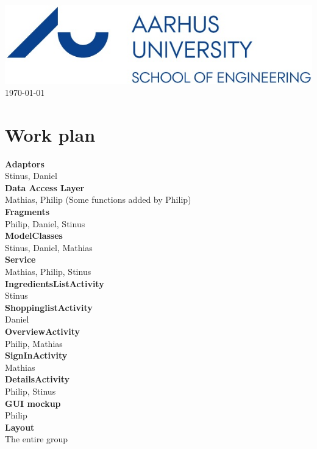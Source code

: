 \documentclass[12pt]{article}
\begin{document}
\begin{titlepage}
		
		\includegraphics[scale=0.5]{Img/logo.jpg}\\[1cm]
		
		
		{\large \today}\\[0.5cm] %
		
		
		\vfill %
		
	\end{titlepage}
	
\newpage
\tableofcontents
\newpage
\listoffigures
\newpage

\hypersetup{linkcolor=blue}

\section{Work plan}

\textbf{Adaptors}
\\
Stinus, Daniel\\
\textbf{Data Access Layer}\\
Mathias, Philip (Some functions added by Philip)\\
\textbf{Fragments}\\
Philip, Daniel, Stinus\\
\textbf{ModelClasses}\\
Stinus, Daniel, Mathias\\
\textbf{Service}\\
Mathias, Philip, Stinus\\
\textbf{IngredientsListActivity}\\
Stinus\\
\textbf{ShoppinglistActivity}\\
Daniel\\
\textbf{OverviewActivity}\\
Philip, Mathias\\
\textbf{SignInActivity}\\
Mathias\\
\textbf{DetailsActivity}\\
Philip, Stinus\\
\textbf{GUI mockup}\\
Philip\\
\textbf{Layout}\\
The entire group\\
\end{document}
